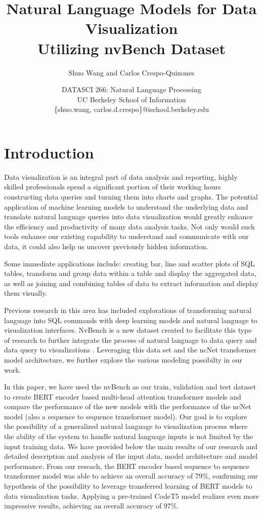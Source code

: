 \documentclass[
	a4paper, %
	10pt, %
	unnumberedsections, %
	twoside, %
]{t0003}
\title{Natural Language Models for Data Visualization\\ Utilizing nvBench Dataset} %
\author{
	Shuo Wang and Carlos Crespo-Quinones
}
\date{\footnotesize DATASCI 266: Natural Language Processing \\ UC Berkeley School of Information \\ \{shuo.wang, carlos.d.crespo\}@ischool.berkeley.edu}
\begin{document}
\maketitle %


\section{Introduction}

Data visualization is an integral part of data analysis and reporting, highly skilled professionals spend a significant portion of their working hours constructing data queries and turning them into charts and graphs. The potential application of machine learning models to understand the underlying data and translate natural language queries into data visualization would greatly enhance the efficiency and productivity of many data analysis tasks. Not only would such tools enhance our existing capability to understand and communicate with our data, it could also help us uncover previously hidden information.

Some immediate applications include: creating bar, line and scatter plots of SQL tables, transform and group data within a table and display the aggregated data, as well as joining and combining tables of data to extract information and display them visually.

Previous research in this area has included explorations of transforming natural language into SQL commands\cite{Zhong:2017qr, Yu:2019qr} with deep learning models and natural language to visualization interfaces\cite{Cox:2001qr}. NvBench is a new dataset created to facilitate this type of research to further integrate the process of natural language to data query and data query to visualizations\cite{Luo:2021qr} . Leveraging this data set and the ncNet transformer model architecture\cite{Luo:2022qr}, we further explore the various modeling possibilty in our work.

In this paper, we have used the nvBench as our train, validation and test dataset to create BERT encoder based multi-head attention transformer models and compare the performance of the new models with the performance of the ncNet model (also a sequence to sequence transformer model). Our goal is to explore the possibility of a generalized natural language to visualization process where the ability of the system to handle natural language inputs is not limited by the input training data. We have provided below the main results of our research and detailed description and analysis of the input data, model architecture and model performance.
From our reseach, the BERT encoder based sequence to sequence transformer model was able to achieve an overall accuracy of 79\%, confirming our hypothesis of the possibility to leverage transferred learning of BERT models to data visualization tasks. Applying a pre-trained CodeT5 model realizes even more impressive results, achieving an overall accuracy of 97\%.
\end{document}
